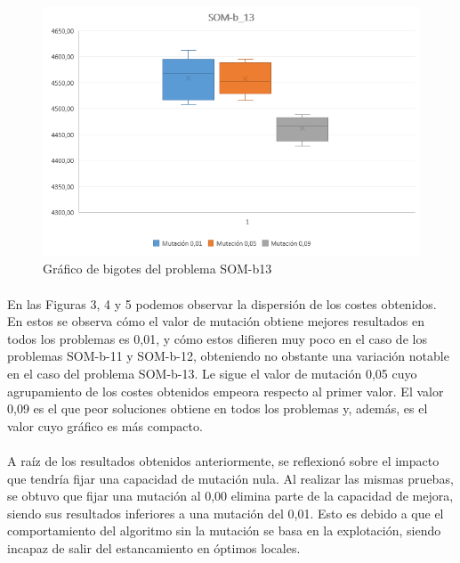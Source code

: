 	\begin{figure}[H]
		
		\centering
		\includegraphics[scale=0.65]{img/BigotesMutacionSOM_13}
		\caption{Gráfico de bigotes del problema SOM-b13}
		
	\end{figure}

	\paragraph{}En las Figuras 3, 4 y 5 podemos observar la dispersión de los costes obtenidos. En estos se observa cómo el valor de mutación obtiene mejores resultados en todos los problemas es 0,01, y cómo estos difieren muy poco en el caso de los problemas SOM-b-11 y SOM-b-12, obteniendo no obstante una variación notable en el caso del problema SOM-b-13.  Le sigue el valor de mutación 0,05 cuyo agrupamiento de los costes obtenidos empeora respecto al primer valor. El valor 0,09 es el que peor soluciones obtiene en todos los problemas y, además, es el valor cuyo gráfico es más compacto.
	
	\paragraph{}A raíz de los resultados obtenidos anteriormente, se reflexionó sobre el impacto que tendría fijar una capacidad de mutación nula. Al realizar las mismas pruebas, se obtuvo que fijar una mutación al 0,00 elimina parte de la capacidad de mejora, siendo sus resultados inferiores a una mutación del 0,01. Esto es debido a que el comportamiento del algoritmo sin la mutación se basa en la explotación, siendo incapaz de salir del estancamiento en óptimos locales.
	
